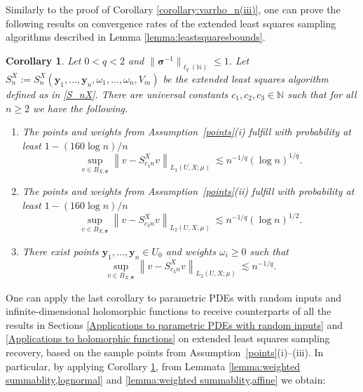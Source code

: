 \documentclass[11pt]{article}
\newtheorem{corollary}{Corollary}[section]
\numberwithin{equation}{section}
\theoremstyle{definition}
\theoremstyle{remark}
\newcommand{\norm}[2]{\left\|{#1}\right\|_{#2}}
\newcommand{\by}{{\boldsymbol{y}}}
\newcommand{\bsigma}{{\boldsymbol{\sigma}}}
\def\NN{{\mathbb N}}
\def\NN{{\mathbb N}}
\def\NN{{\mathbb N}}
\begin{document}
{Similarly to the proof of Corollary \ref{corollary:varrho_n(iii)}, one can prove the following results on convergence rates of the extended least squares sampling algorithms described in Lemma \ref{lemma:leastsquaresbounds}.

\begin{corollary} \label{corollary:varrho_n}
	Let $0< q < 2$ and {$\|\bsigma^{-1}\|_{\ell_q(\NN)} \le 1$}. 
		Let 
	$S_{{n}}^X 
	:=
	S_{{n}}^X(\by_1, \dots, \by_{{n}}, \omega_1, \dots, \omega_{{n}}, V_m) $ 
	be the extended least squares algorithm defined as in \eqref{S_nX}.
	There are universal constants $c_1, c_2, c_3 \in \NN$ such that for all $n \ge 2$ we have the following.
	\begin{enumerate}
		\item[\rm (i)]
        The points and weights from Assumption~\ref{points}{\rm (i)} fulfill with probability at least $1-(160\log n)/n$
		\begin{equation}\nonumber
			\sup_{v\in B_{X,\bsigma}} \norm{v - S_{c_1n}^X v}{L_2(U,X;\mu)}
            \ \lesssim n^{-1/q} (\log n)^{1/q}.
		\end{equation}
		\item[\rm (ii)]
            The points and weights from Assumption~\ref{points}{\rm (ii)} fulfill with probability at least $1-(160\log n)/n$
		\begin{equation}\nonumber
			\sup_{v\in B_{X,\bsigma}} \norm{v - S_{c_2n}^X v}{L_2(U,X;\mu)}
			\ \lesssim n^{-1/q}  (\log n)^{1/2}.
	\end{equation}
	\item[\rm (iii)]
    There exist points $\by_1, \dots, \by_n\in U_0$ and weights $\omega_i\ge 0$ such that
	\begin{equation}\nonumber
		\sup_{v\in B_{X,\bsigma}} \norm{v - S_{c_3n}^X v}{L_2(U,X;\mu)}
		\ \lesssim n^{-1/q}.
	\end{equation}
	\end{enumerate}	
\end{corollary}	

One can apply the last corollary to parametric PDEs with random inputs and infinite-dimensional holomorphic functions to receive counterparts of all the results in Sections \ref{Applications to parametric PDEs with random inputs} and \ref{Applications to holomorphic functions} on extended least squares sampling recovery, based on the sample points from 
Assumption~\ref{points}{\rm (i)}--{\rm (iii)}.
In particular, by applying Corollary \ref{corollary:varrho_n}, from Lemmata \ref{lemma:weighted summablity,lognormal} and
\ref{lemma:weighted summablity,affine} we obtain:

}
\end{document}
